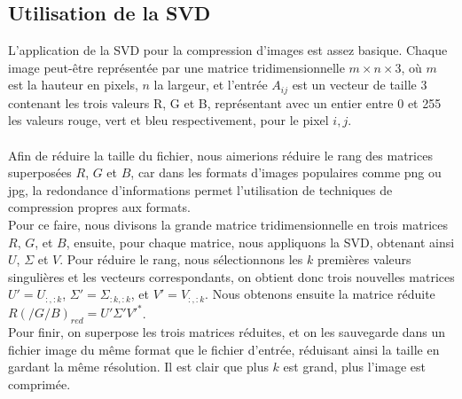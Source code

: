 \documentclass[11pt]{article}
\begin{document}
\subsection*{Utilisation de la SVD}
L'application de la SVD pour la compression d'images est assez basique. Chaque image peut-être représentée par une matrice tridimensionnelle $m \times n \times 3$, où $m$ est la hauteur en pixels, $n$ la largeur, et l'entrée $A_{ij}$ est un vecteur de taille 3 contenant les trois valeurs R, G et B, représentant avec un entier entre 0 et 255 les valeurs rouge, vert et bleu respectivement, pour le pixel $i, j$.\\\\
Afin de réduire la taille du fichier, nous aimerions réduire le rang des matrices superposées $R$, $G$ et $B$, car dans les formats d'images populaires comme png ou jpg, la redondance d'informations permet l'utilisation de techniques de compression propres aux formats.\\
Pour ce faire, nous divisons la grande matrice tridimensionnelle en trois matrices $R$, $G$, et $B$, ensuite, pour chaque matrice, nous appliquons la SVD, obtenant ainsi $U$, $\Sigma$ et $V$. Pour réduire le rang, nous sélectionnons les $k$ premières valeurs singulières et les vecteurs correspondants, on obtient donc trois nouvelles matrices $U' = U_{:,:k}$, $\Sigma' = \Sigma_{:k, :k}$, et $V' = V_{:, :k}$. Nous obtenons ensuite la matrice réduite $R(/G/B)_{red} = U'\Sigma'V'^*$.\\
Pour finir, on superpose les trois matrices réduites, et on les sauvegarde dans un fichier image du même format que le fichier d'entrée, réduisant ainsi la taille en gardant la même résolution. Il est clair que plus $k$ est grand, plus l'image est comprimée.
\end{document}
